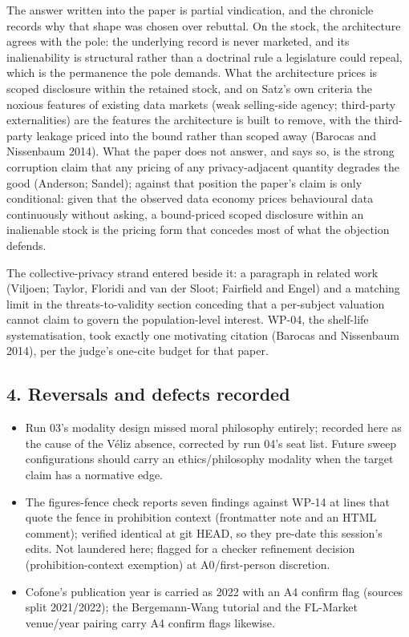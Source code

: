 \documentclass[
  11pt,
]{article}
\providecommand{\tightlist}{%
  \setlength{\itemsep}{0pt}\setlength{\parskip}{0pt}}
\begin{document}
The answer written into the paper is partial vindication, and the
chronicle records why that shape was chosen over rebuttal. On the stock,
the architecture agrees with the pole: the underlying record is never
marketed, and its inalienability is structural rather than a doctrinal
rule a legislature could repeal, which is the permanence the pole
demands. What the architecture prices is scoped disclosure within the
retained stock, and on Satz's own criteria the noxious features of
existing data markets (weak selling-side agency; third-party
externalities) are the features the architecture is built to remove,
with the third-party leakage priced into the bound rather than scoped
away (Barocas and Nissenbaum 2014). What the paper does not answer, and
says so, is the strong corruption claim that any pricing of any
privacy-adjacent quantity degrades the good (Anderson; Sandel); against
that position the paper's claim is only conditional: given that the
observed data economy prices behavioural data continuously without
asking, a bound-priced scoped disclosure within an inalienable stock is
the pricing form that concedes most of what the objection defends.

The collective-privacy strand entered beside it: a paragraph in related
work (Viljoen; Taylor, Floridi and van der Sloot; Fairfield and Engel)
and a matching limit in the threats-to-validity section conceding that a
per-subject valuation cannot claim to govern the population-level
interest. WP-04, the shelf-life systematisation, took exactly one
motivating citation (Barocas and Nissenbaum 2014), per the judge's
one-cite budget for that paper.

\subsection{4. Reversals and defects
recorded}\label{reversals-and-defects-recorded}

\begin{itemize}
\tightlist
\item
  Run 03's modality design missed moral philosophy entirely; recorded
  here as the cause of the Véliz absence, corrected by run 04's seat
  list. Future sweep configurations should carry an ethics/philosophy
  modality when the target claim has a normative edge.
\item
  The figures-fence check reports seven findings against WP-14 at lines
  that quote the fence in prohibition context (frontmatter note and an
  HTML comment); verified identical at git HEAD, so they pre-date this
  session's edits. Not laundered here; flagged for a checker refinement
  decision (prohibition-context exemption) at A0/first-person
  discretion.
\item
  Cofone's publication year is carried as 2022 with an A4 confirm flag
  (sources split 2021/2022); the Bergemann-Wang tutorial and the
  FL-Market venue/year pairing carry A4 confirm flags likewise.
\end{itemize}
\end{document}
